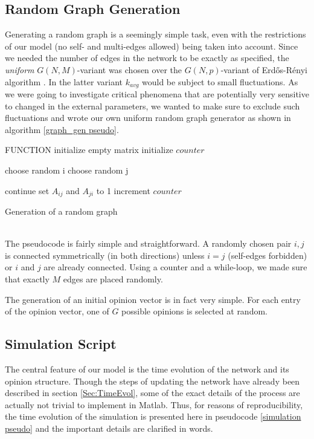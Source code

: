 \documentclass[11pt]{article}
\begin{document}
\subsection{Random Graph Generation}

Generating a random graph is a seemingly simple task, even with the restrictions of our model (no self- and multi-edges allowed) being taken into account. Since we needed the number of edges in the network to be exactly as specified, the \textit{uniform} $G(N,M)$-variant was chosen over the $G(N,p)$-variant of Erd\H{o}s-R\'{e}nyi algorithm \cite{erdos renyi}. In the latter variant $k_{avg}$ would be subject to small fluctuations. As we were going to investigate critical phenomena that are potentially very sensitive to changed in the external parameters, we wanted to make sure to exclude such fluctuations and wrote our own uniform random graph generator as shown in algorithm \ref{graph_gen pseudo}.\\

\begin{algorithm}[H]
\label{graph_gen pseudo}
 \SetAlgoLined
 FUNCTION\;
 initialize empty matrix\;
 initialize $counter$\;
	{
		choose random i\;
		choose random j\;
		
		{
			continue\;
		}
		\Else
		{
			set $A_{ij}$ and $A_{ji}$ to 1\;
			increment $counter$\;
		}
	}


 \caption{Generation of a random graph}
\end{algorithm} \\


The pseudocode is fairly simple and straightforward. A randomly chosen pair $i,j$ is connected symmetrically (in both directions) unless $i = j$ (self-edges forbidden) or $i$ and $j$ are already connected. Using a counter and a while-loop, we made sure that exactly $M$ edges are placed randomly.

The generation of an initial opinion vector is in fact very simple. For each entry of the opinion vector, one of $G$ possible opinions is selected at random.

\subsection{Simulation Script}

The central feature of our model is the time evolution of the network and its opinion structure. Though the steps of updating the network have already been described in section \ref{Sec:TimeEvol}, some of the exact details of the process are actually not trivial to implement in Matlab. Thus, for reasons of reproducibility, the time evolution of the simulation is presented here in pseudocode \ref{simulation pseudo} and the important details are clarified in words.
\end{document}
